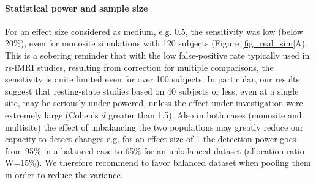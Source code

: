 \documentclass[authoryear]{elsarticle}
\begin{document}


\paragraph{Statistical power and sample size} For an effect size considered as medium, e.g. 0.5, the sensitivity was low (below 20\%), even for monosite simulations with 120 subjects (Figure \ref{fig_real_sim}A). This is a sobering reminder that with the low false-positive rate typically used in rs-fMRI studies, resulting from correction for multiple comparisons, the sensitivity is quite limited even for over 100 subjects. In particular, our results suggest that resting-state studies based on 40 subjects or less, even at a single site, may be seriously under-powered, unless the effect under investigation were extremely large (Cohen's $d$ greater than 1.5). Also in both cases (monosite and multisite) the effect of unbalancing the two populations may greatly reduce our capacity to detect changes e.g. for an effect size of 1 the detection power goes from 95\% in a balanced case to 65\% for an unbalanced dataset (allocation ratio W=15\%). We therefore recommend to favor balanced dataset when pooling them in order to reduce the variance.
\end{document}
